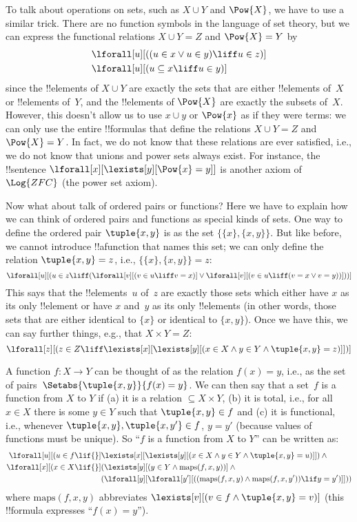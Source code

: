\documentclass[../../../include/open-logic-section]{subfiles}
\begin{document}
To talk about operations on sets, such as $X \cup Y$ and $\Pow{X}$, we
have to use a similar trick.  There are no function symbols in the
language of set theory, but we can express the functional relations $X
\cup Y = Z$ and $\Pow{X} = Y$ by
\begin{align*}
& \lforall[u][((u \in x \lor u \in y) \liff u \in z)]\\
& \lforall[u][(u \subseteq x \liff u \in y )]
\end{align*}
since the !!{element}s of $X \cup Y$ are exactly the sets that are
either !!{element}s of~$X$ or !!{element}s of~$Y$, and the
!!{element}s of $\Pow{X}$ are exactly the subsets of~$X$.  However,
this doesn't allow us to use $x \cup y$ or $\Pow{x}$ as if they were
terms: we can only use the entire !!{formula}s that define the
relations $X \cup Y = Z$ and $\Pow{X} = Y$. In fact, we do not know
that these relations are ever satisfied, i.e., we do not know that
unions and power sets always exist. For instance, the !!{sentence}
$\lforall[x][\lexists[y][\Pow{x} = y]]$ is another axiom
of~$\Log{ZFC}$ (the power set axiom).

Now what about talk of ordered pairs or functions?  Here we have to
explain how we can think of ordered pairs and functions as special
kinds of sets.  One way to define the ordered pair $\tuple{x, y}$ is
as the set $\{\{x\}, \{x, y\}\}$.  But like before, we cannot
introduce !!a{function} that names this set; we can only define the
relation $\tuple{x, y} = z$, i.e., $\{\{x\}, \{x, y\}\} = z$:
\[
\lforall[u][(u \in z \liff (\lforall[v][(v \in u \liff v = x)] \lor
  \lforall[v][(v \in u \liff (v = x \lor v = y))]))]
\]
This says that the !!{element}s~$u$ of~$z$ are exactly those sets which
either have $x$ as its only !!{element} or have $x$ and~$y$ as its
only !!{element}s (in other words, those sets that are either identical
to $\{x\}$ or identical to $\{x, y\}$).  Once we have this, we can say
further things, e.g., that $X \times Y = Z$:
\[
\lforall[z][(z \in Z \liff \lexists[x][\lexists[y][(x \in
        X \land y \in Y \land \tuple{x, y} = z)]])]
\]

A function $f \colon X \to Y$ can be thought of as the relation $f(x)
= y$, i.e., as the set of pairs~$\Setabs{\tuple{x,y}}{f(x) = y}$. We
can then say that a set~$f$ is a function from $X$ to $Y$ if (a) it is
a relation $\subseteq X \times Y$, (b) it is total, i.e., for all $x
\in X$ there is some $y \in Y$ such that $\tuple{x, y} \in f$ and (c)
it is functional, i.e., whenever $\tuple{x, y}, \tuple{x, y'} \in f$,
$y = y'$ (because values of functions must be unique). So ``$f$ is a
function from $X$ to $Y$'' can be written as:
\begin{align*}
 \lforall[u][(u \in f \lif {}] & \lexists[x][\lexists[y][(x \in X \land y \in
      Y \land \tuple{x, y} = u)]]) \land {}\\
 \lforall[x][(x \in X \lif {}] &
      (\lexists[y][(y \in Y \land \mathrm{maps}(f, x, y))] \land {}\\
& (\lforall[y][\lforall[y'][((\mathrm{maps}(f, x, y) \land
    \mathrm{maps}(f, x, y')) \lif y = y')]]))
\end{align*}
where $\mathrm{maps}(f, x, y)$ abbreviates $\lexists[v][(v \in f \land
  \tuple{x, y} = v)]$ (this !!{formula} expresses ``$f(x) = y$'').
\end{document}
